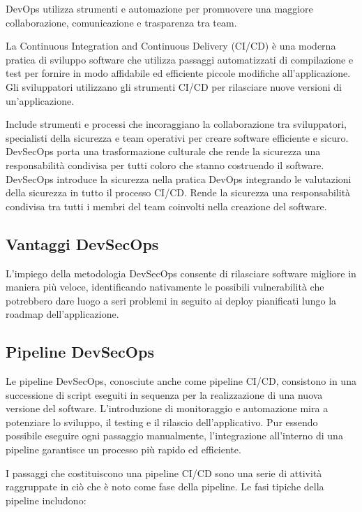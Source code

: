 DevOps utilizza strumenti e automazione per promuovere una maggiore collaborazione, comunicazione e trasparenza tra team.

La Continuous Integration and Continuous Delivery (CI/CD) è una moderna pratica di sviluppo software che utilizza passaggi automatizzati di compilazione e test per fornire in modo affidabile ed efficiente piccole modifiche all'applicazione. Gli sviluppatori utilizzano gli strumenti CI/CD per rilasciare nuove versioni di un'applicazione.

Include strumenti e processi che incoraggiano la collaborazione tra sviluppatori, specialisti della sicurezza e team operativi per creare software efficiente e sicuro. DevSecOps porta una trasformazione culturale che rende la sicurezza una responsabilità condivisa per tutti coloro che stanno costruendo il software. DevSecOps introduce la sicurezza nella pratica DevOps integrando le valutazioni della sicurezza in tutto il processo CI/CD. Rende la sicurezza una responsabilità condivisa tra tutti i membri del team coinvolti nella creazione del software.
\subsection{Vantaggi DevSecOps}
L’impiego della metodologia DevSecOps consente di rilasciare software migliore in maniera più veloce, identificando nativamente le possibili vulnerabilità che potrebbero dare luogo a seri problemi in seguito ai deploy pianificati lungo la roadmap dell’applicazione.
\subsection{Pipeline DevSecOps} 
Le pipeline DevSecOps, conosciute anche come pipeline CI/CD, consistono in una successione di script eseguiti in sequenza per la realizzazione di una nuova versione del software. L'introduzione di monitoraggio e automazione mira a potenziare lo sviluppo, il testing e il rilascio dell'applicativo. Pur essendo possibile eseguire ogni passaggio manualmente, l'integrazione all'interno di una pipeline garantisce un processo più rapido ed efficiente.

I passaggi che costituiscono una pipeline CI/CD sono una serie di attività raggruppate in ciò che è noto come fase della pipeline. Le fasi tipiche della pipeline includono:

